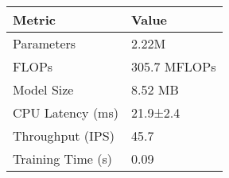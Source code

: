 \begin{tabular}{ll}
\toprule
Metric & Value \\
\midrule
Parameters & 2.22M \\
FLOPs & 305.7 MFLOPs \\
Model Size & 8.52 MB \\
CPU Latency (ms) & 21.9±2.4 \\
Throughput (IPS) & 45.7 \\
Training Time (s) & 0.09 \\
\bottomrule
\end{tabular}


